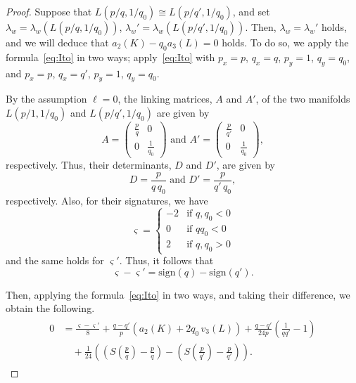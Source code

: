 \documentclass[10pt,a4paper]{amsart}
\begin{document}
\begin{proof}
Suppose that $L(p/q,1/q_0) \cong L(p/q', 1/q_0)$, and set $\lambda_w = \lambda_w ( L(p/q,1/q_0))$, $\lambda_w' = \lambda_w ( L(p/q', 1/q_0))$. 
Then, $\lambda_w = \lambda_w'$ holds, and we will deduce that $a_2 (K) - q_0 a_3(L) = 0$ holds. 
To do so, we apply the formula~\eqref{eq:Ito} in two ways; 
apply~\eqref{eq:Ito} with $p_x=p$, $q_x=q$, $p_y=1$, $q_y=q_0$, and $p_x=p$, $q_x=q'$, $p_y=1$, $q_y=q_0$. 

By the assumption $\ell=0$, the linking matrices, $A$ and $A'$, of the two manifolds $L(p/1,1/q_0)$ and $L(p/q', 1/q_0)$ are given by
\[ A = \begin{pmatrix} \frac{p}{q} & 0 \\ 0 & \frac{1}{q_0} \end{pmatrix} \text{ and } A'=\begin{pmatrix} \frac{p}{q'} & 0 \\ 0 & \frac{1}{q_0} \end{pmatrix}, \] 
respectively. 
Thus, their determinants, $D$ and $D'$, are given by 
\[ D = \frac{p}{q\,q_0} \text{ and } D'=\frac{p}{q'\,q_0} , \]
respectively. 
Also, for their signatures, we have
\[
\varsigma = 
\begin{cases}
    -2 & \text{if } q,q_0 <0 \\
    0 & \text{if } q q_0 <0 \\
    2 & \text{if } q,q_0 >0
\end{cases}
\]
and the same holds for $\varsigma'$. 
Thus, it follows that 
\[ \varsigma - \varsigma' = \mathrm{sign}(q) - \mathrm{sign}(q').\]

Then, applying the formula~\eqref{eq:Ito} in two ways, and taking their difference, we obtain the following. 
\begin{align}\label{Eq2}
\begin{split}
0
&= \frac{\varsigma - \varsigma'}{8} 
+ \frac{q-q'}{p} \left( a_2(K) + 2 q_0 \,v_3(L) \right)
+ \frac{q-q'}{24p} \left( \frac{1}{qq'} - 1 \right)\\
&\quad + \frac{1}{24} \left( \left( S\left( \frac{p}{q} \right) - \frac{p}{q} \right) - \left( S\left( \frac{p}{q'} \right) - \frac{p}{q'} \right) \right) . 
\end{split}
\end{align}


\end{proof}
\end{document}
